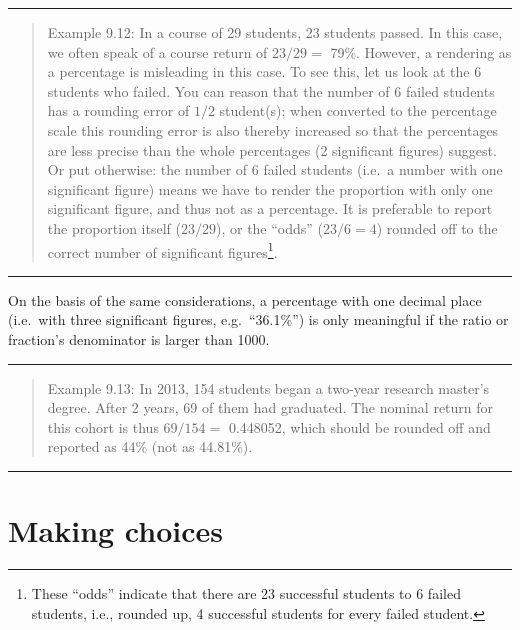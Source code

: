 \documentclass[
]{book}
\begin{document}
\begin{center}\rule{0.5\linewidth}{0.5pt}\end{center}

\begin{quote}
Example 9.12:
In a course of 29 students, 23 students passed. In this case, we often
speak of a course return of \(23/29=\) 79\%. However, a rendering as a
percentage is misleading in this case. To see this, let us look
at the 6 students who failed. You can reason that the number of 6 failed
students has a rounding error of \(1/2\) student(s); when converted to the
percentage scale this rounding error is also thereby increased so that
the percentages are less precise than the whole percentages (2
significant figures) suggest. Or put otherwise: the number of 6
failed students (i.e.~a number with one significant figure) means we have
to render the proportion with only one significant figure, and thus not
as a percentage. It is preferable to report the proportion itself (\(23/29\)), or
the ``odds'' (\(23/6=4\)) rounded off to the correct number of significant
figures\footnote{These ``odds'' indicate that there are 23 successful students to 6 failed students, i.e., rounded up, 4 successful students for every failed student.}.
\end{quote}

\begin{center}\rule{0.5\linewidth}{0.5pt}\end{center}

On the basis of the same considerations, a percentage with one decimal
place (i.e.~with three significant figures, e.g.~``36.1\%'') is only
meaningful if the ratio or fraction's denominator is larger than 1000.

\begin{center}\rule{0.5\linewidth}{0.5pt}\end{center}

\begin{quote}
Example 9.13:
In 2013, 154 students began a two-year research master's degree. After
2 years, 69 of them had graduated. The nominal return for this cohort is
thus \(69/154=\) 0.448052, which should be rounded off and reported as 44\%
(not as 44.81\%).
\end{quote}

\begin{center}\rule{0.5\linewidth}{0.5pt}\end{center}

\hypertarget{sec:robustefficient}{%
\section{Making choices}\label{sec:robustefficient}}
\end{document}
